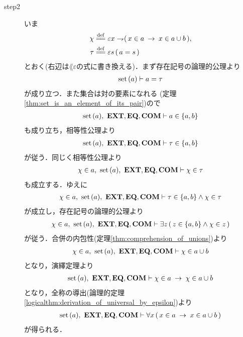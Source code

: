 \begin{sketch}
\begin{description}
			\item[step2]
				いま
				\begin{align}
					\chi &\defeq \varepsilon x \negation (\, x \in a \rarrow x \in a \cup b\, ), \\
					\tau &\defeq \varepsilon s\, (\, a = s\, )
				\end{align}
				とおく(右辺は$\lang{\varepsilon}$の式に書き換える)．まず存在記号の論理的公理より
				\begin{align}
					\operatorname*{set}\hspace{0.15em}(a) \vdash a = \tau
				\end{align}
				が成り立つ．また集合は対の要素になれる
				(定理\ref{thm:set_is_an_element_of_its_pair})ので
				\begin{align}
					\operatorname*{set}\hspace{0.15em}(a),\ \mbox{{\bf EXT}},\mbox{{\bf EQ}},\mbox{\bf COM} \vdash a \in \{a,b\}
				\end{align}
				も成り立ち，相等性公理より
				\begin{align}
					\operatorname*{set}\hspace{0.15em}(a),\ \mbox{{\bf EXT}},\mbox{{\bf EQ}},\mbox{\bf COM} \vdash \tau \in \{a,b\}
				\end{align}
				が従う．同じく相等性公理より
				\begin{align}
					\chi \in a,\ \operatorname*{set}\hspace{0.15em}(a),\ \mbox{{\bf EXT}},\mbox{{\bf EQ}},\mbox{\bf COM} \vdash \chi \in \tau
				\end{align}
				も成立する．ゆえに
				\begin{align}
					\chi \in a,\ \operatorname*{set}\hspace{0.15em}(a),\ \mbox{{\bf EXT}},\mbox{{\bf EQ}},\mbox{\bf COM} \vdash 
					\tau \in \{a,b\} \wedge \chi \in \tau
				\end{align}
				が成立し，存在記号の論理的公理より
				\begin{align}
					\chi \in a,\ \operatorname*{set}\hspace{0.15em}(a),\ \mbox{{\bf EXT}},\mbox{{\bf EQ}},\mbox{\bf COM} \vdash 
					\exists z\, (\, z \in \{a,b\} \wedge \chi \in z\, )
				\end{align}
				が従う．合併の内包性(定理\ref{thm:comprehension_of_unions})より
				\begin{align}
					\chi \in a,\ \operatorname*{set}\hspace{0.15em}(a),\ \mbox{{\bf EXT}},\mbox{{\bf EQ}},\mbox{\bf COM} \vdash 
					\chi \in a \cup b
				\end{align}
				となり，演繹定理より
				\begin{align}
					\operatorname*{set}\hspace{0.15em}(a),\ \mbox{{\bf EXT}},\mbox{{\bf EQ}},\mbox{\bf COM} \vdash 
					\chi \in a \hspace{0.25em}\rightarrow\hspace{0.25em} \chi \in a \cup b
				\end{align}
				となり，全称の導出(論理的定理\ref{logicalthm:derivation_of_universal_by_epsilon})より
				\begin{align}
					\operatorname*{set}\hspace{0.15em}(a),\ \mbox{{\bf EXT}},\mbox{{\bf EQ}},\mbox{\bf COM} \vdash 
					\forall x\, (\, x \in a \hspace{0.25em}\rightarrow\hspace{0.25em} x \in a \cup b\, )
				\end{align}
				が得られる．
				\QED
		\end{description}
	\end{sketch}
	
